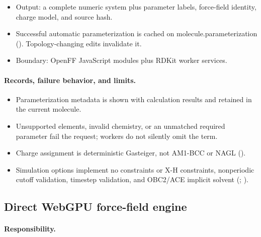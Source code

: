 \documentclass[11pt]{article}
\begin{document}
\begin{small}
\begin{itemize}[leftmargin=*]
\item Output: a complete numeric system plus parameter labels, force-field identity, charge model, and source hash.

\item Successful automatic parameterization is cached on molecule.parameterization (). Topology-changing edits invalidate it.

\end{itemize}

\begin{itemize}[leftmargin=*]

\item Boundary: OpenFF JavaScript modules plus RDKit worker services.

\end{itemize}

\paragraph{Records, failure behavior, and limits.}

\begin{itemize}[leftmargin=*]

\item Parameterization metadata is shown with calculation results and retained in the current molecule.

\item Unsupported elements, invalid chemistry, or an unmatched required parameter fail the request; workers do not silently omit the term.

\item Charge assignment is deterministic Gasteiger, not AM1-BCC or NAGL ().

\item Simulation options implement no constraints or X-H constraints, nonperiodic cutoff validation, timestep validation, and OBC2/ACE implicit solvent (; ).

\end{itemize}

\subsection{Direct WebGPU force-field engine}\label{appB:sec11}

\paragraph{Responsibility.}


\end{small}
\end{document}
